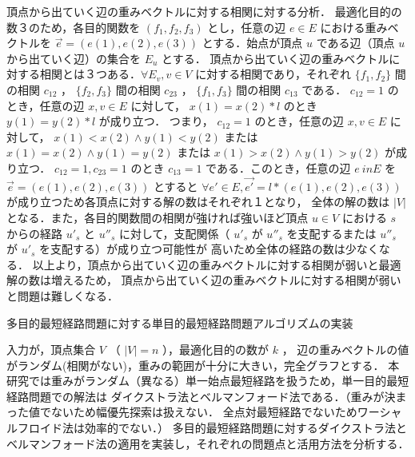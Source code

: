 \documentclass[12pt]{optlab-bachelor}
\begin{document}
頂点から出ていく辺の重みベクトルに対する相関に対する分析．
最適化目的の数３のため，各目的関数を $(f_1,f_2,f_3)$ とし，任意の辺 $e　\in E$ における重みベクトルを
 $\vec{e}=(e(1),e(2),e(3))$ とする．始点が頂点 $u$ である辺（頂点 $u$ から出ていく辺）の集合を $E_u$ とする．
頂点から出ていく辺の重みベクトルに対する相関とは３つある．$\forall E_v , v \in V$ に対する相関であり，それぞれ
 $\{f_1,f_2\}$ 間の相関 $c_{12}$ ， $\{f_2,f_3\}$ 間の相関 $c_{23}$ ， $\{f_1,f_3\}$ 間の相関 $c_{13}$ である．
$c_{12}=1$ のとき，任意の辺 $x,v\in E$ に対して， $x(1)=x(2)* l$ のとき $y(1)=y(2)*l$ が成り立つ．
つまり， $c_{12}=1$ のとき，任意の辺 $x,v\in E$ に対して， $x(1)<x(2) \land y(1)<y(2)$ または
 $x(1)=x(2) \land y(1)=y(2)$ または $x(1)>x(2) \land y(1)>y(2)$ が成り立つ．
$c_{12}=1,c_{23}=1$ のとき $c_{13}=1$ である．このとき，任意の辺 $e \ inE$ を $\vec{e}=(e(1),e(2),e(3))$ とすると
 $\forall e'\in E,\vec{e'} = l*(e(1),e(2),e(3))$ が成り立つため各頂点に対する解の数はそれぞれ１となり，
全体の解の数は $|V|$ となる．また，各目的関数間の相関が強ければ強いほど頂点 $u\in V$ における $s$ からの経路 $u'_{s}$ と
 $u''_{s}$ に対して，支配関係（ $u'_{s}$ が $u''_{s}$ を支配するまたは $u''_{s}$ が $u'_{s}$ を支配する）が成り立つ可能性が
高いため全体の経路の数は少なくなる．
以上より，頂点から出ていく辺の重みベクトルに対する相関が弱いと最適解の数は増えるため，
頂点から出ていく辺の重みベクトルに対する相関が弱いと問題は難しくなる．


\begin{description}
  \item[多目的最短経路問題に対する単目的最短経路問題アルゴリズムの実装]
\end{description}

入力が，頂点集合 $V$ （ $|V|=n$ ），最適化目的の数が $k$ ，
辺の重みベクトルの値がランダム(相関がない)，重みの範囲が十分に大きい，完全グラフとする．
本研究では重みがランダム（異なる）単一始点最短経路を扱うため，単一目的最短経路問題での解法は
ダイクストラ法とベルマンフォード法である．（重みが決まった値でないため幅優先探索は扱えない．
全点対最短経路でないためワーシャルフロイド法は効率的でない．）
多目的最短経路問題に対するダイクストラ法とベルマンフォード法の適用を実装し，それぞれの問題点と活用方法を分析する．
\end{document}
